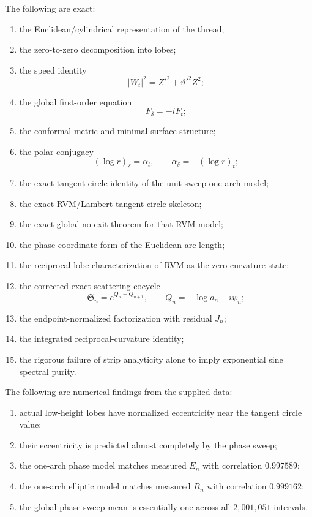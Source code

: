 \documentclass[11pt]{article}
\theoremstyle{definition}
\begin{document}
The following are exact:
\begin{enumerate}[leftmargin=1.8em]
\item the Euclidean/cylindrical representation of the thread;
\item the zero-to-zero decomposition into lobes;
\item the speed identity
\[
|W_t|^2=Z'^2+\vartheta'^2Z^2;
\]
\item the global first-order equation
\[
F_\delta=-iF_t;
\]
\item the conformal metric and minimal-surface structure;
\item the polar conjugacy
\[
(\log r)_\delta=\alpha_t,
\qquad
\alpha_\delta=-(\log r)_t;
\]
\item the exact tangent-circle identity of the unit-sweep one-arch model;
\item the exact RVM/Lambert tangent-circle skeleton;
\item the exact global no-exit theorem for that RVM model;
\item the phase-coordinate form of the Euclidean arc length;
\item the reciprocal-lobe characterization of RVM as the zero-curvature state;
\item the corrected exact scattering cocycle
\[
\mathfrak S_n=e^{Q_n-Q_{n+1}},
\qquad
Q_n=-\log a_n-i\psi_n;
\]
\item the endpoint-normalized factorization with residual $J_n$;
\item the integrated reciprocal-curvature identity;
\item the rigorous failure of strip analyticity alone to imply exponential
sine spectral purity.
\end{enumerate}

The following are numerical findings from the supplied data:
\begin{enumerate}[leftmargin=1.8em]
\item actual low-height lobes have normalized eccentricity near the tangent
circle value;
\item their eccentricity is predicted almost completely by the phase sweep;
\item the one-arch phase model matches measured $E_n$ with correlation
$0.997589$;
\item the one-arch elliptic model matches measured $R_n$ with correlation
$0.999162$;
\item the global phase-sweep mean is essentially one across all
$2{,}001{,}051$ intervals.
\end{enumerate}
\end{document}
